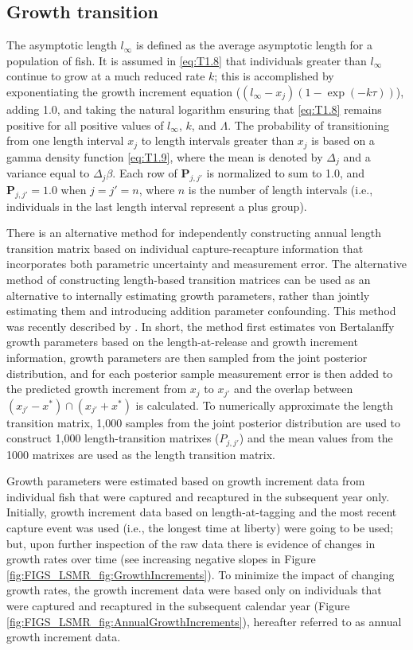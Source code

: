 \subsection{Growth transition} %
\label{sub:growth_transition}
The asymptotic length $l_\infty$ is defined as the average asymptotic length for a population of fish.  It is assumed in \eqref{eq:T1.8} that individuals greater than $l_\infty$ continue to grow at a much reduced rate $k$; this is accomplished by exponentiating the growth increment equation ($(l_\infty-x_j)(1-\exp(-k\tau))$), adding 1.0, and taking the natural logarithm ensuring that \eqref{eq:T1.8} remains positive for all positive values of $l_\infty$, $k$, and $\Lambda$.
The probability of transitioning from one length interval $x_j$ to length intervals greater than $x_{j}$ is based on a gamma density function \eqref{eq:T1.9}, where the mean is denoted by $\Delta_j$ and a variance equal to $\Delta_j \beta$.  Each row of $\mathbf{P}_{j,j'}$ is normalized to sum to 1.0, and $\mathbf{P}_{j,j'}=1.0$ when $j=j'=n$, where $n$ is the number of length intervals (i.e., individuals in the last length interval represent a plus group).

There is an alternative method for independently constructing annual length transition matrix based on individual capture-recapture information that incorporates both parametric uncertainty and measurement error.  The alternative method of constructing length-based transition matrices can be used as an alternative to internally estimating growth parameters, rather than jointly estimating them and introducing addition parameter confounding.  This method was recently described by \cite{hillary2010new}. In short, the method first estimates von Bertalanffy growth parameters based on the length-at-release and growth increment information, growth parameters are then sampled from the joint posterior distribution, and for each posterior sample measurement error is then added to the predicted growth increment  from $x_j$ to $x_{j'}$ and the overlap between $(x_{j'}-x^*) \cap (x_{j'}+x^*)$ is calculated.  To numerically approximate the length transition matrix, 1,000 samples from the joint posterior distribution are used to construct 1,000 length-transition matrixes ($P_{j,j'}$) and the mean values from the 1000 matrixes are used as the length transition matrix.

Growth parameters were estimated based on growth increment data from individual fish that were captured and recaptured in the subsequent year only.  Initially, growth increment data based on length-at-tagging and the most recent capture event was used (i.e., the longest time at liberty) were going to be used; but, upon further inspection of the raw data  there is evidence of changes in growth rates over time (see increasing negative slopes in Figure \ref{fig:FIGS_LSMR_fig:GrowthIncrements}).  To minimize the impact of changing growth rates, the growth increment data were based only on individuals that were captured and recaptured in the subsequent calendar year (Figure \ref{fig:FIGS_LSMR_fig:AnnualGrowthIncrements}), hereafter referred to as annual growth increment data.



